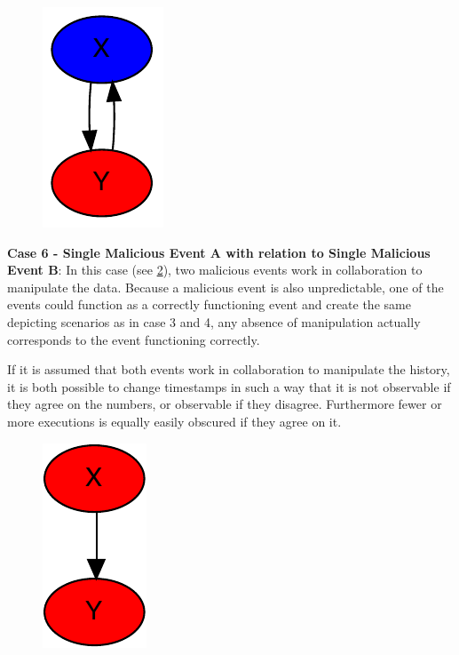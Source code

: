 	\begin{figure}[H]
		\centering
		\includegraphics[]{5validation/images/6.pdf}
		\caption{}
		\label{fig:consensus:single-good-with-twoway-malicious-relation}
	\end{figure}
	
	\newpar \textbf{Case 6 - Single Malicious Event A with relation to Single Malicious Event B}: In this case (see \ref{fig:consensus:single-malicious-with-twoway-malicious-relation}), two malicious events work in collaboration to manipulate the data. Because a malicious event is also unpredictable, one of the events could function as a correctly functioning event and create the same depicting scenarios as in case 3 and 4, any absence of manipulation actually corresponds to the event functioning correctly.
	
	If it is assumed that both events work in collaboration to manipulate the history, it is both possible to change timestamps in such a way that it is not observable if they agree on the numbers, or observable if they disagree. Furthermore fewer or more executions is equally easily obscured if they agree on it.
	
	
	\begin{figure}[H]
		\centering
		\includegraphics[]{5validation/images/4.pdf}
		\caption{}
		\label{fig:consensus:single-malicious-with-twoway-malicious-relation}
	\end{figure}
	
